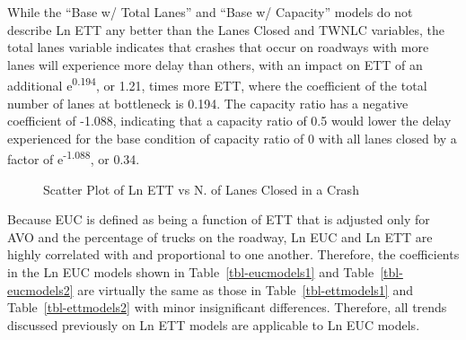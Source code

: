 \documentclass[
  letterpaper,
  authoryear]{elsarticle}
\begin{document}
While the ``Base w/ Total Lanes'' and ``Base w/ Capacity'' models do not
describe Ln ETT any better than the Lanes Closed and TWNLC variables,
the total lanes variable indicates that crashes that occur on roadways
with more lanes will experience more delay than others, with an impact
on ETT of an additional e\textsuperscript{0.194}, or 1.21, times more
ETT, where the coefficient of the total number of lanes at bottleneck is
0.194. The capacity ratio has a negative coefficient of -1.088,
indicating that a capacity ratio of 0.5 would lower the delay
experienced for the base condition of capacity ratio of 0 with all lanes
closed by a factor of e\textsuperscript{-1.088}, or 0.34.

\begin{figure}


\caption{\label{fig-LnETTvsLanesClosed}Scatter Plot of Ln ETT vs N. of
Lanes Closed in a Crash}

\end{figure}%

Because EUC is defined as being a function of ETT that is adjusted only
for AVO and the percentage of trucks on the roadway, Ln EUC and Ln ETT
are highly correlated with and proportional to one another. Therefore,
the coefficients in the Ln EUC models shown in
Table~\ref{tbl-eucmodels1} and Table~\ref{tbl-eucmodels2} are virtually
the same as those in Table~\ref{tbl-ettmodels1} and
Table~\ref{tbl-ettmodels2} with minor insignificant differences.
Therefore, all trends discussed previously on Ln ETT models are
applicable to Ln EUC models.
\end{document}
